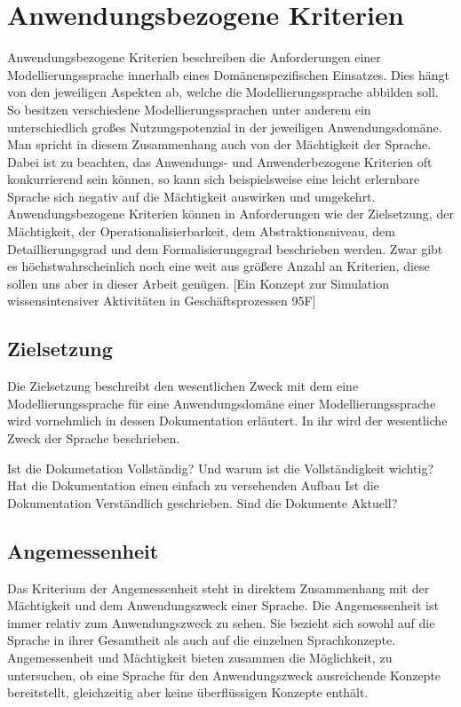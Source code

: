 \section{Anwendungsbezogene Kriterien}
\label{sc:AnwendungsbezogeneKriterien}
Anwendungsbezogene Kriterien beschreiben die Anforderungen einer Modellierungssprache innerhalb eines Domänenspezifischen Einsatzes.
Dies hängt von den jeweiligen Aspekten ab, welche die Modellierungssprache abbilden soll.
So besitzen verschiedene Modellierungssprachen unter anderem ein unterschiedlich großes Nutzungspotenzial in der jeweiligen Anwendungsdomäne.
Man spricht in diesem Zusammenhang auch von der Mächtigkeit der Sprache.
Dabei ist zu beachten, das Anwendungs- und Anwenderbezogene Kriterien oft konkurrierend sein können,
so kann sich beispielsweise eine leicht erlernbare Sprache sich negativ auf die Mächtigkeit auswirken und umgekehrt.
Anwendungsbezogene Kriterien können in Anforderungen wie der Zielsetzung, der Mächtigkeit, der Operationalisierbarkeit,
dem Abstraktionsniveau, dem Detaillierungsgrad und dem Formalisierungsgrad beschrieben werden.
Zwar gibt es höchstwahrscheinlich noch eine weit aus größere Anzahl an Kriterien, diese sollen uns aber in dieser Arbeit genügen.  
[Ein Konzept zur Simulation wissensintensiver Aktivitäten in Geschäftsprozessen 95F]

\subsection{Zielsetzung}
\label{ssc:Dokumentation}
Die Zielsetzung beschreibt den wesentlichen Zweck mit dem eine Modellierungssprache für eine Anwendungsdomäne einer Modellierungssprache wird vornehmlich in dessen Dokumentation erläutert. In ihr wird der wesentliche Zweck der Sprache beschrieben.

Ist die Dokumetation Vollständig? Und warum ist die Vollständigkeit wichtig?
Hat die Dokumentation einen einfach zu versehenden Aufbau
Ist die Dokumentation Verständlich geschrieben.
Sind die Dokumente Aktuell?


\subsection{Angemessenheit}
Das Kriterium der Angemessenheit steht in direktem Zusammenhang mit der Mächtigkeit und dem
Anwendungszweck einer Sprache. Die Angemessenheit ist immer relativ zum Anwendungszweck zu
sehen. Sie bezieht sich sowohl auf die Sprache in ihrer Gesamtheit als auch auf die einzelnen Sprachkonzepte.
Angemessenheit und Mächtigkeit bieten zusammen die Möglichkeit, zu untersuchen, ob
eine Sprache für den Anwendungszweck ausreichende Konzepte bereitstellt, gleichzeitig aber keine
überflüssigen Konzepte enthält.
